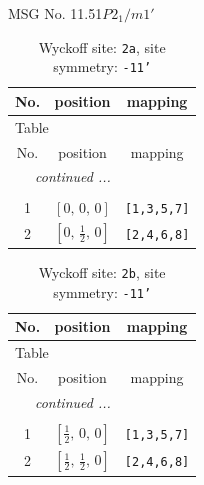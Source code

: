 \documentclass[fleqn,8pt]{jsarticle}
\begin{document}
\setcounter{MaxMatrixCols}{32}

\renewcommand{\tablename}{Table~}
\renewcommand{\figurename}{Figure~}
\begin{center}
\LARGE
MSG No. 11.51\quad$P2_{1}/m1'$
\end{center}
\renewcommand{\arraystretch}{1.2}
\begin{longtable}{ccc}
\caption{Wyckoff site: {\tt 2a}, site symmetry: {\tt -11'}}
 \\
 \hline \hline
No. & position & mapping \\ \hline \endfirsthead

\multicolumn{2}{l}{\tablename\ \thetable{}} \\
 \hline \hline
No. & position & mapping \\ \hline \endhead

 \hline \hline
\multicolumn{2}{r}{\footnotesize\it continued ...} \\ \endfoot

 \hline \hline
\multicolumn{2}{r}{} \\ \endlastfoot

1 & $\left[ 0,\, 0,\, 0 \right]$ & {\tt [1,3,5,7]} \\ \hline
2 & $\left[ 0,\, \frac{1}{2},\, 0 \right]$ & {\tt [2,4,6,8]} \\
\end{longtable}
\renewcommand{\arraystretch}{1.2}
\begin{longtable}{ccc}
\caption{Wyckoff site: {\tt 2b}, site symmetry: {\tt -11'}}
 \\
 \hline \hline
No. & position & mapping \\ \hline \endfirsthead

\multicolumn{2}{l}{\tablename\ \thetable{}} \\
 \hline \hline
No. & position & mapping \\ \hline \endhead

 \hline \hline
\multicolumn{2}{r}{\footnotesize\it continued ...} \\ \endfoot

 \hline \hline
\multicolumn{2}{r}{} \\ \endlastfoot

1 & $\left[ \frac{1}{2},\, 0,\, 0 \right]$ & {\tt [1,3,5,7]} \\ \hline
2 & $\left[ \frac{1}{2},\, \frac{1}{2},\, 0 \right]$ & {\tt [2,4,6,8]} \\
\end{longtable}
\renewcommand{\arraystretch}{1.2}
\end{document}
